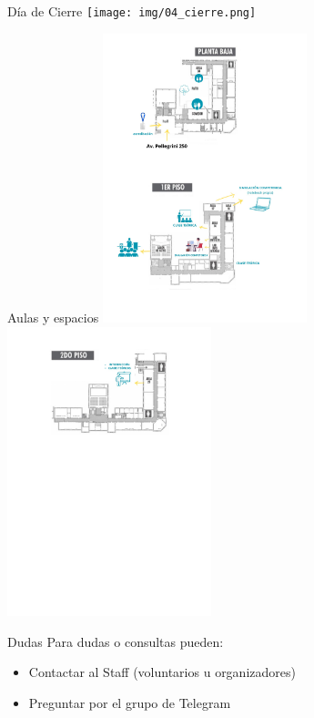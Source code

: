 \documentclass{beamer}
\begin{document}
\begin{frame}{Día de Cierre}
    \centering
    \texttt{[image: img/04\_cierre.png]}
\end{frame}

\begin{frame}{Aulas y espacios}
    \centering
    \includegraphics[clip,height=8.4cm,keepaspectratio]{img/mapa_00.jpeg}
    \includegraphics[clip,height=8.4cm,keepaspectratio]{img/mapa_01.jpeg}
\end{frame}

\begin{frame}{Dudas}
Para dudas o consultas pueden:
        \begin{itemize}
            \item Contactar al Staff (voluntarios u organizadores)
            \item Preguntar por el grupo de Telegram
        \end{itemize}
\end{frame}
\end{document}
